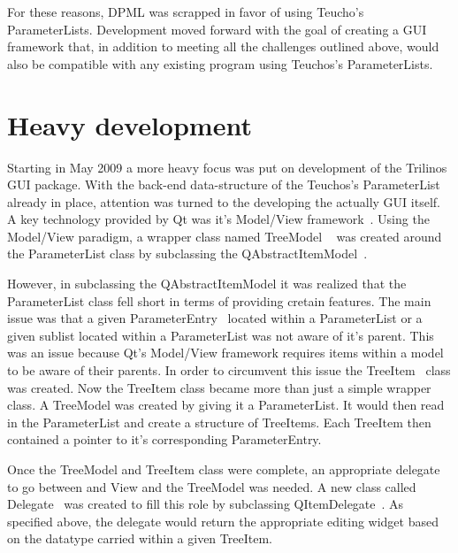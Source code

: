 For these reasons, DPML was scrapped in favor of using Teucho's ParameterLists. Development moved
forward with the goal of creating a GUI framework that, in addition to meeting all the challenges 
outlined above, would also be compatible with any existing program using Teuchos's ParameterLists.

\section{Heavy development}
Starting in May 2009 a more heavy focus was put on development of the Trilinos GUI package.
With the back-end data-structure of the Teuchos's ParameterList already in place, attention
was turned to the developing the actually GUI itself. A key technology provided by Qt was it's Model/View
framework~\cite{QtModelView}. Using the Model/View paradigm, a wrapper class named TreeModel
~\cite{TreeModel} was created around the ParameterList class by subclassing the 
QAbstractItemModel~\cite{QAbstractItemModel}.

However, in subclassing the QAbstractItemModel it was realized that the ParameterList class fell short 
in terms of providing cretain features. The main issue was that a given ParameterEntry~\cite{ParameterEntry} located within
a ParameterList or a given sublist located within a ParameterList was not aware of it's parent.
This was an issue because Qt's Model/View framework requires items within a model to be aware of
their parents. In order to circumvent this issue the TreeItem~\cite{TreeItem} class was created. Now the TreeItem class
became more than just a simple wrapper class. A TreeModel was created by giving it a ParameterList.
It would then read in the ParameterList and create a structure of TreeItems.  Each TreeItem then contained a pointer 
to it's corresponding ParameterEntry.

Once the TreeModel and TreeItem class were complete, an appropriate delegate to go between and View
and the TreeModel was needed. A new class called Delegate~\cite{Delegate} was created to fill this
role by subclassing QItemDelegate~\cite{QItemDelegate}. As specified above, the delegate would return
the appropriate editing widget based on the datatype carried within a given TreeItem.

